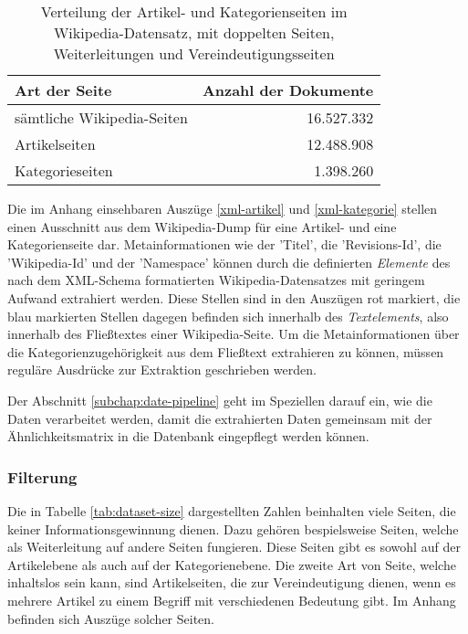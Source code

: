 \begin{table}
\centering
\begin{tabular}{l r}
  \hline
  Art der Seite & Anzahl der Dokumente \\
  \hline
  sämtliche Wikipedia-Seiten & 16.527.332 \\
  Artikelseiten & 12.488.908 \\
  Kategorieseiten & 1.398.260 \\
  \hline
\end{tabular}
\caption{Verteilung der Artikel- und Kategorienseiten im Wikipedia-Datensatz, mit doppelten Seiten, Weiterleitungen und Vereindeutigungsseiten}
\label{tab:xml-overview}
\end{table}


Die im Anhang einsehbaren Auszüge \ref{xml-artikel} und \ref{xml-kategorie} stellen einen Ausschnitt aus dem Wikipedia-Dump für eine Artikel- und eine Kategorienseite dar.
Metainformationen wie der 'Titel', die 'Revisions-Id', die 'Wikipedia-Id' und der 'Namespace' können durch die definierten \emph{Elemente} des nach dem XML-Schema formatierten Wikipedia-Datensatzes mit geringem Aufwand extrahiert werden.
Diese Stellen sind in den Auszügen rot markiert, die blau markierten Stellen dagegen befinden sich innerhalb des \emph{Textelements}, also innerhalb des Fließtextes einer Wikipedia-Seite.
Um die Metainformationen über die Kategorienzugehörigkeit aus dem Fließtext extrahieren zu können, müssen reguläre Ausdrücke zur Extraktion geschrieben werden.


Der Abschnitt \ref{subchap:date-pipeline} geht im Speziellen darauf ein, wie die Daten verarbeitet werden, damit die extrahierten Daten gemeinsam mit der Ähnlichkeitsmatrix in die Datenbank eingepflegt werden können.

\subsubsection{Filterung}
Die in Tabelle \ref{tab:dataset-size} dargestellten Zahlen beinhalten viele Seiten, die keiner Informationsgewinnung dienen.
Dazu gehören bespielsweise Seiten, welche als Weiterleitung auf andere Seiten fungieren. Diese Seiten gibt es sowohl auf der Artikelebene als auch auf der Kategorienebene.
Die zweite Art von Seite, welche inhaltslos sein kann, sind Artikelseiten, die zur Vereindeutigung dienen, wenn es mehrere Artikel zu einem Begriff mit verschiedenen Bedeutung gibt.
Im Anhang befinden sich Auszüge solcher Seiten.


